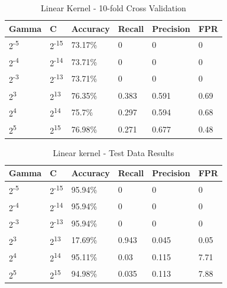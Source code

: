 \documentclass[conference]{IEEEtran}
\begin{document}
\begin{table}[h]
\caption{Linear Kernel - 10-fold Cross Validation}
\begin{center}
\begin{tabular}{ | l | l | l | l | l | l |}
\hline
Gamma & C & Accuracy & Recall & Precision & FPR \\
\hline\hline
2\textsuperscript{-5} & 2\textsuperscript{-15} & 73.17\% & 0 & 0 & 0 \\
\hline
2\textsuperscript{-4} & 2\textsuperscript{-14} & 73.71\% & 0 & 0 & 0 \\
\hline
2\textsuperscript{-3} & 2\textsuperscript{-13} & 73.71\% & 0 & 0 & 0 \\
\hline
2\textsuperscript{3} & 2\textsuperscript{13} & 76.35\% & 0.383 & 0.591 & 0.69 \\
\hline
2\textsuperscript{4} & 2\textsuperscript{14} & 75.7\% & 0.297 & 0.594 & 0.68 \\
\hline
2\textsuperscript{5} & 2\textsuperscript{15} & 76.98\% & 0.271 & 0.677 & 0.48 \\
\hline
\end{tabular}
\end{center}
\end{table}
 

 \begin{table}[h]
\caption{Linear kernel - Test Data Results}
\begin{center}
\begin{tabular}{ | l | l | l | l | l | l |}
\hline
Gamma & C & Accuracy & Recall & Precision & FPR \\
\hline\hline
2\textsuperscript{-5} & 2\textsuperscript{-15} & 95.94\% & 0 & 0 & 0 \\
\hline
2\textsuperscript{-4} & 2\textsuperscript{-14} & 95.94\% & 0 & 0 & 0 \\
\hline
2\textsuperscript{-3} & 2\textsuperscript{-13} & 95.94\% & 0 & 0 & 0 \\
\hline
2\textsuperscript{3} & 2\textsuperscript{13} & 17.69\% & 0.943 & 0.045 & 0.05 \\
\hline
2\textsuperscript{4} & 2\textsuperscript{14} & 95.11\% & 0.03 & 0.115 & 7.71 \\
\hline
2\textsuperscript{5} & 2\textsuperscript{15} & 94.98\% & 0.035 & 0.113 & 7.88 \\
\hline
\end{tabular}
\end{center}
\end{table}
\end{document}
